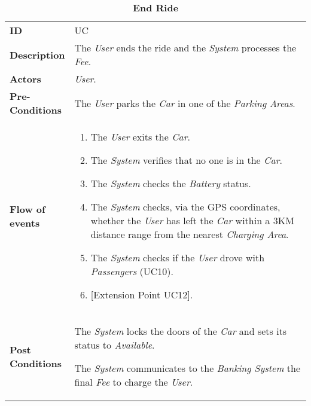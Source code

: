 \begin{longtable}{|p{0.2\linewidth} p{0.8\linewidth}|}
	\captionsetup{labelformat=empty} %
	\caption{\textbf{End Ride}} %
	\label{UC_EndRide}%
	\\ \hline %
	
	\textbf{ID} & UC\theUseCaseIdCounter \\ \hline
	\textbf{Description} & The \emph{User} ends the ride and the \emph{System} processes the \emph{Fee}. \\ \hline
	\textbf{Actors} & \emph{User}.\\ \hline
	\textbf{Pre-Conditions} & The \emph{User} parks the \emph{Car} in one of the \emph{Parking Areas}. \\ \hline
	\textbf{Flow of events} & 
	\begin{enumerate}
		\item The \emph{User} exits the \emph{Car}.
		\item The \emph{System} verifies that no one is in the \emph{Car}.
		\item The \emph{System} checks the \emph{Battery} status. 
		\item The \emph{System} checks, via the GPS coordinates, whether the \emph{User} has left the \emph{Car} within a 3KM distance range from the nearest \emph{Charging Area}.
		\item The \emph{System} checks if the \emph{User} drove with \emph{Passengers} (UC10).
		\item {[}Extension Point UC12{]}.
	\end{enumerate}	 \\ \hline
	\textbf{Post Conditions} & The \emph{System} locks the doors of the \emph{Car} and sets its status to \emph{Available}.
	
	The \emph{System} communicates to the \emph{Banking System} the final \emph{Fee} to charge the \emph{User}. 
	

\end{longtable}
